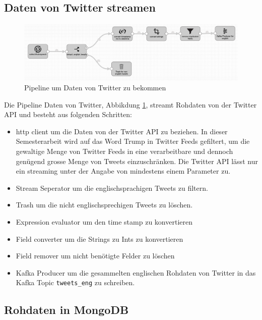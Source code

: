 \subsection{Daten von Twitter streamen}
\label{sec:collect_tweets}

\begin{figure}[H]
	\centering
		\includegraphics[scale=0.4 ]{images/pipeline_collect_tweets.png}
	\caption{Pipeline um Daten von Twitter zu bekommen}
	\label{fig:pipline_collect_tweets}
\end{figure}

Die Pipeline Daten von Twitter, Abbikdung \ref{fig:pipline_collect_tweets}, streamt Rohdaten von der Twitter API und  besteht aus folgenden Schritten:

\begin{itemize}
  \item http client um die Daten von der Twitter API zu beziehen. In dieser Semesterarbeit wird auf das Word Trump in Twitter Feeds gefiltert, um die gewaltige Menge von Twitter Feeds in eine verarbeitbare und dennoch gen{\"u}gend grosse Menge von Tweets einzuschr{\"a}nken. Die Twitter API l{\"a}sst nur ein streaming unter der Angabe von mindestens einem Parameter zu.
  \item Stream Seperator um die englischsprachigen Tweets zu filtern.
  \item Trash um die nicht englischsprechigen Tweets zu l{\"o}schen.
  \item Expression evaluator um den time stamp zu konvertieren
  \item Field converter um die Strings zu Ints zu konvertieren
  \item Field remover um nicht ben{\"o}tigte Felder zu l{\"o}schen
  \item Kafka Producer um die gesammelten englischen Rohdaten von Twitter in das Kafka Topic  \texttt{tweets\_eng} zu schreiben.
\end{itemize}
 

\subsection{Rohdaten in MongoDB}
\label{sec:tweets_to_mongo}

